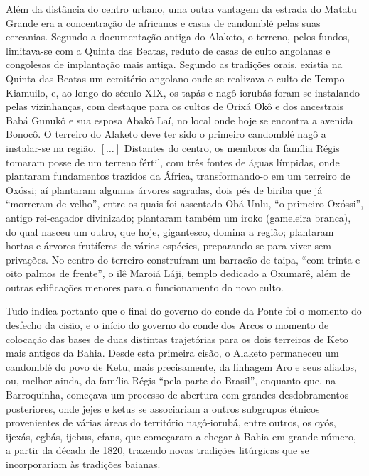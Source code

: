 \begin{citacao}
Além da distância do centro urbano, uma outra vantagem da estrada do Matatu Grande era a concentração de africanos e casas de candomblé pelas suas cercanias. Segundo a documentação antiga do Alaketo, o terreno, pelos fundos, limitava-se com a Quinta das Beatas, reduto de casas de culto angolanas e congolesas de implantação mais antiga. Segundo as tradições orais, existia na Quinta das Beatas um cemitério angolano onde se realizava o culto de Tempo Kiamuilo, e, ao longo do século XIX, os tapás e nagô-iorubás foram se instalando pelas vizinhanças, com destaque para os cultos de Orixá Okô e dos ancestrais Babá Gunukô e sua esposa Abakô Laí, no local onde hoje se encontra a avenida Bonocô. O terreiro do Alaketo deve ter sido o primeiro candomblé nagô a instalar-se na região. \([\dots]\) Distantes do centro, os membros da família Régis tomaram posse de um terreno fértil, com três fontes de águas límpidas, onde plantaram fundamentos trazidos da África, transformando-o em um terreiro de Oxóssi; aí plantaram algumas árvores sagradas, dois pés de biriba que já “morreram de velho”, entre os quais foi assentado Obá Unlu, “o primeiro Oxóssi”, antigo rei-caçador divinizado; plantaram também um iroko (gameleira branca), do qual nasceu um outro, que hoje, gigantesco, domina a região; plantaram hortas e árvores frutíferas de várias espécies, preparando-se para viver sem privações. No centro do terreiro construíram um barracão de taipa, ``com trinta e oito palmos de frente'', o ilê Maroiá Láji, templo dedicado a Oxumarê, além de outras edificações menores para o funcionamento do novo culto.

Tudo indica portanto que o final do governo do conde da Ponte foi o momento do desfecho da cisão, e o início do governo do conde dos Arcos o momento de colocação das bases de duas distintas trajetórias para os dois terreiros de Keto mais antigos da Bahia. Desde esta primeira cisão, o Alaketo permaneceu um candomblé do povo de Ketu, mais precisamente, da linhagem Aro e seus aliados, ou, melhor ainda, da família Régis “pela parte do Brasil”, enquanto que, na Barroquinha, começava um processo de abertura com grandes desdobramentos posteriores, onde jejes e ketus se associariam a outros subgrupos étnicos provenientes de várias áreas do território nagô-iorubá, entre outros, os oyós, ijexás, egbás, ijebus, efans, que começaram a chegar à Bahia em grande número, a partir da década de 1820, trazendo novas tradições litúrgicas que se incorporariam às tradições baianas.


\end{citacao}
